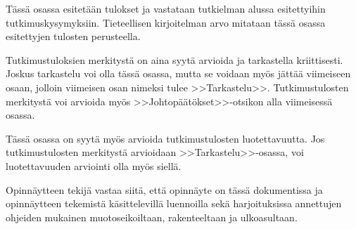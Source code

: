 \documentclass[english,12pt,a4paper,pdftex,sci,utf8]{aaltothesis}
\begin{document}

T\"ass\"a osassa esitet\"a\"an tulokset ja vastataan tutkielman alussa
esitettyihin tutkimuskysymyksiin. Tieteellisen kirjoitelman
arvo mitataan t\"ass\"a osassa esitettyjen tulosten perusteella.

Tutkimustuloksien merkityst\"a on aina syyt\"a arvioida ja tarkastella
kriittisesti.  Joskus tarkastelu voi olla t\"ass\"a osassa, mutta se
voidaan my\"os j\"att\"a\"a viimeiseen osaan, jolloin viimeisen osan nimeksi
tulee >>Tarkastelu>>. Tutkimustulosten merkityst\"a voi arvioida my\"os
>>Johtop\"a\"at\"okset>>-otsikon alla viimeisess\"a osassa.


T\"ass\"a osassa on syyt\"a my\"os arvioida tutkimustulosten luotettavuutta.
Jos tutkimustulosten merkityst\"a arvioidaan >>Tarkastelu>>-osassa,
voi luotettavuuden arviointi olla my\"os siell\"a.

Opinn\"aytteen tekij\"a vastaa siit\"a, ett\"a opinn\"ayte on t\"ass\"a dokumentissa
ja opinn\"aytteen tekemist\"a k\"asittelevill\"a luennoilla sek\"a
harjoituksissa annettujen ohjeiden mukainen muotoseikoiltaan,
rakenteeltaan ja ulkoasultaan.

\clearpage
\end{document}
